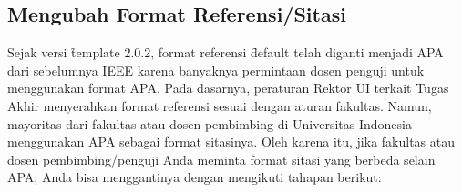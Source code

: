 \subsection{Mengubah Format Referensi/Sitasi}
\label{sec:bibtexChangeFormat}
Sejak versi \f{template} 2.0.2, format referensi \f{default} telah diganti menjadi APA dari sebelumnya IEEE karena banyaknya permintaan dosen penguji untuk menggunakan format APA. Pada dasarnya, peraturan Rektor UI terkait Tugas Akhir menyerahkan format referensi sesuai dengan aturan fakultas. Namun, mayoritas dari fakultas atau dosen pembimbing di Universitas Indonesia menggunakan APA sebagai format sitasinya. Oleh karena itu, jika fakultas atau dosen pembimbing/penguji Anda meminta format sitasi yang berbeda selain APA, Anda bisa menggantinya dengan mengikuti tahapan berikut:
